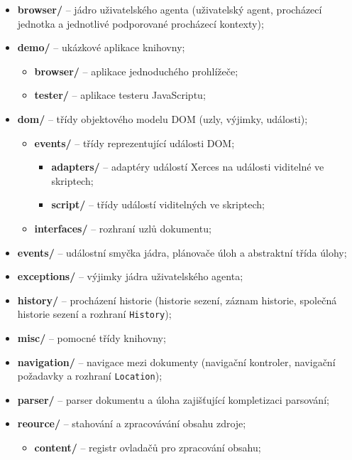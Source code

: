 \begin{itemize}
  \item \textbf{browser/} -- jádro uživatelského agenta (uživatelský agent, procházecí jednotka a jednotlivé podporované procházecí kontexty);
  \item \textbf{demo/} -- ukázkové aplikace knihovny;
     \begin{itemize}
       \item[] \textbf{browser/} -- aplikace jednoduchého prohlížeče;
       \item[] \textbf{tester/} -- aplikace testeru JavaScriptu;
     \end{itemize}
  \item \textbf{dom/} -- třídy objektového modelu DOM (uzly, výjimky, události);
     \begin{itemize}
       \item[] \textbf{events/} -- třídy reprezentující události DOM;
         \begin{itemize}
           \item[] \textbf{adapters/} -- adaptéry událostí Xerces na události viditelné ve skriptech;
           \item[] \textbf{script/} -- třídy událostí viditelných ve skriptech;
         \end{itemize}
       \item[] \textbf{interfaces/} -- rozhraní uzlů dokumentu;
     \end{itemize}
  \item \textbf{events/} -- událostní smyčka jádra, plánovače úloh a abstraktní třída úlohy;
  \item \textbf{exceptions/} -- výjimky jádra uživatelského agenta;
  \item \textbf{history/} -- procházení historie (historie sezení, záznam historie, společná historie sezení a rozhraní \texttt{History});
  \item \textbf{misc/} -- pomocné třídy knihovny;
  \item \textbf{navigation/} -- navigace mezi dokumenty (navigační kontroler, navigační požadavky a rozhraní \texttt{Location});
  \item \textbf{parser/} -- parser dokumentu a úloha zajišťující kompletizaci parsování;
  \newpage
  \item \textbf{reource/} -- stahování a zpracovávání obsahu zdroje;
     \begin{itemize}
       \item[] \textbf{content/} -- registr ovladačů pro zpracování obsahu;

\end{itemize}
\end{itemize}

